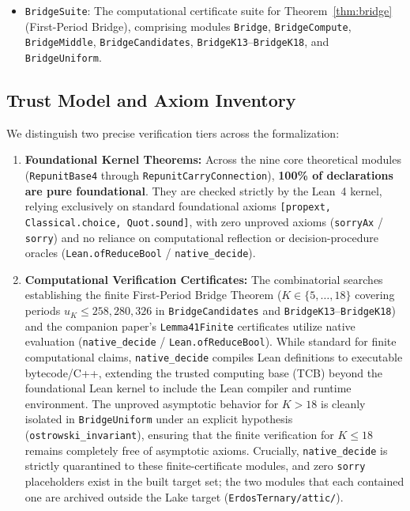 \documentclass[11pt,reqno]{amsart}
\theoremstyle{plain}
\theoremstyle{definition}
\theoremstyle{remark}
\begin{document}
{\begin{itemize}
    \item \texttt{BridgeSuite}: The computational certificate suite for Theorem~\ref{thm:bridge} (First-Period Bridge), comprising modules \texttt{Bridge}, \texttt{BridgeCompute}, \texttt{BridgeMiddle}, \texttt{BridgeCandidates}, \texttt{BridgeK13}--\texttt{BridgeK18}, and \texttt{BridgeUniform}.
\end{itemize}\par}

\subsection{Trust Model and Axiom Inventory}

We distinguish two precise verification tiers across the formalization:
\begin{enumerate}\setlength{\itemsep}{0.5pt}\setlength{\parsep}{0pt}\setlength{\parskip}{0pt}
    \item \textbf{Foundational Kernel Theorems:} Across the nine core theoretical modules (\texttt{RepunitBase4} through \texttt{RepunitCarryConnection}), \textbf{100\% of declarations are pure foundational}. They are checked strictly by the Lean~4 kernel, relying exclusively on standard foundational axioms \texttt{[propext, Classical.choice, Quot.sound]}, with zero unproved axioms (\texttt{sorryAx} / \texttt{sorry}) and no reliance on computational reflection or decision-procedure oracles (\texttt{Lean.ofReduceBool} / \texttt{native\_decide}).
    \item {\sloppy \textbf{Computational Verification Certificates:} The combinatorial searches establishing the finite First-Period Bridge Theorem ($K \in \{5, \dots, 18\}$ covering periods $u_K \le 258,280,326$ in \texttt{BridgeCandidates} and \texttt{BridgeK13}--\texttt{BridgeK18}) and the companion paper's \texttt{Lemma41Finite} certificates utilize native evaluation (\texttt{native\_decide} / \texttt{Lean.ofReduceBool}). While standard for finite computational claims, \texttt{native\_decide} compiles Lean definitions to executable bytecode/C++, extending the trusted computing base (TCB) beyond the foundational Lean kernel to include the Lean compiler and runtime environment. The unproved asymptotic behavior for $K > 18$ is cleanly isolated in \texttt{BridgeUniform} under an explicit hypothesis (\texttt{ostrowski\_invariant}), ensuring that the finite verification for $K \le 18$ remains completely free of asymptotic axioms. Crucially, \texttt{native\_decide} is strictly quarantined to these finite-certificate modules, and zero \texttt{sorry} placeholders exist in the built target set; the two modules that each contained one are archived outside the Lake target (\texttt{ErdosTernary/attic/}).\par}
\end{enumerate}

\clearpage



\end{document}
